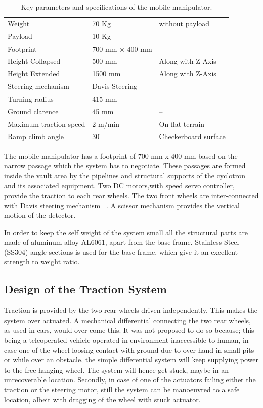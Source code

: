 %
\begin{table}[!htbp]
	\caption{Key parameters and specifications of the mobile manipulator.}
	\label{tb:specifications}
	\centering
	\begin{tabular}{l l l}
		\hline
		
		Weight  & 70 Kg & without payload \\ 
		Payload & 10 Kg &---\\
		Footprint & 700 mm $\times$  400 mm & - \\
		Height Collapsed & 500 mm  & Along with Z-Axis\\
		Height Extended & 1500 mm & Along with Z-Axis  \\
		Steering mechanism & Davis Steering & --\\
		Turning radius & 415 mm & - \\
		Ground clarence & 45 mm & --\\
		Maximum traction speed & 2 m/min & On flat terrain \\
		Ramp climb angle & $30^\circ $ & Checkerboard surface\\
		\hline
	\end{tabular}
\end{table}

The mobile-manipulator has a footprint of 700 mm x 400 mm  based on the narrow passage which the system  has to negotiate. These passages are formed inside the vault area by the pipelines and  structural supports of the cyclotron and its associated equipment.  Two DC motors,with speed servo controller,  provide the traction to each rear wheels. The two front wheels are  inter-connected with Davis steering mechanism ~\cite{TOMBook}. A scissor mechanism provides the vertical  motion of the detector.

 In order to keep the self weight of the system small all the  structural parts are made of aluminum alloy AL6061, apart from the base frame. Stainless Steel (SS304)  angle sections is used for the base frame, which give it an excellent strength to weight ratio. 

\subsection{Design of the Traction System}
Traction is provided by the two rear wheels driven independently. This makes the system over actuated. A mechanical differential connecting the two rear wheels, as used in cars,  would over come this. It was not proposed to do so because;  this being a teleoperated vehicle operated in environment inaccessible to human, in case  one of the wheel loosing contact with ground due to  over hand in small pits or while over an obstacle, the simple differential system will keep supplying power to the free hanging wheel. The system will hence get stuck, maybe in an unrecoverable location. Secondly, in case of one of the actuators failing either the traction or the steering motor, still the system can be manoeuvred to a  safe location, albeit with dragging of the wheel with stuck actuator.

